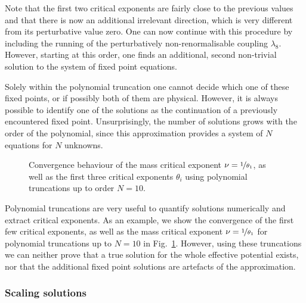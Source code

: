 \documentclass[11pt]{book}
\numberwithin{equation}{chapter}
\begin{document}
Note that the first two critical exponents are fairly close to the previous values
and that there is now an additional irrelevant direction, which is very different
from its perturbative value zero. One can now continue with this procedure by including
the running of the perturbatively non-renormalisable coupling $\lambda_8$. However,
starting at this order, one finds an additional, second non-trivial solution to the system
of fixed point equations.

Solely within the polynomial truncation one cannot decide which one of these fixed points,
or if possibly both of them are physical. However, it is always possible to identify
one of the solutions as the continuation of a previously encountered fixed point.
Unsurprisingly, the number of solutions grows with the order of the polynomial, since
this approximation provides a system of $N$ equations for $N$ unknowns.

\begin{figure}
  \begin{center}
    
  \end{center}
  \vspace*{-4mm}
  \caption{
    Convergence behaviour of the mass critical exponent $\nu = \nicefrac 1{\theta_1}$,
    as well as the first three critical exponents $\theta_i$ using polynomial
    truncations up to order $N=10$.
  }
  \label{fig:critexponent}
\end{figure}

Polynomial truncations are very useful to quantify solutions numerically and extract
critical exponents. As an example, we show the convergence of the first few critical
exponents, as well as the mass critical exponent $\nu = \nicefrac{1}{\theta_1}$
for polynomial truncations up to $N=10$ in Fig.~\ref{fig:critexponent}.
However, using these truncations we can neither prove that a true solution for
the whole effective potential exists, nor that the additional fixed point solutions
are artefacts of the approximation.

\subsubsection{Scaling solutions}
\end{document}
